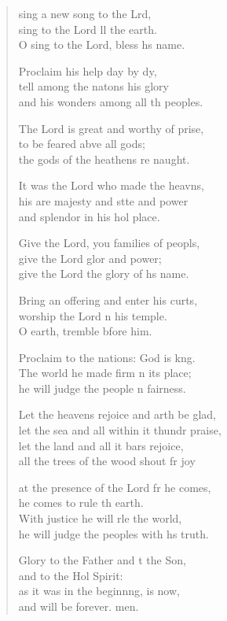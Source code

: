 \begin{verse}
  \begin{patverse}
 sing a new song to the Lrd,\Flex\\
sing to the Lord ll the earth.\Med\\
O sing to the Lord, bless h\pointup{\i}s name.

Proclaim his help day by dy,\Flex\\
tell among the nat\pointup{\i}ons his glory\Med\\
and his wonders among all th peoples.

The Lord is great and worthy of prise,\Flex\\
to be feared abve all gods;\Med\\
the gods of the heathens re naught.

It was the Lord who made the heavns,\Flex\\
his are majesty and stte and power\Med\\
and splendor in his hol place.

Give the Lord, you families of peopls,\Flex\\
give the Lord glor and power;\Med\\
give the Lord the glory of h\pointup{\i}s name.

Bring an offering and enter his curts,\Flex\\
worship the Lord \pointup{\i}n his temple.\Med\\
O earth, tremble bfore him.

Proclaim to the nations: God is k\pointup{\i}ng.\Flex\\
The world he made firm \pointup{\i}n its place;\Med\\
he will judge the people \pointup{\i}n fairness.

Let the heavens rejoice and arth be glad,\Med\\
let the sea and all within it thundr praise,\\
let the land and all it bars rejoice,\Med\\
all the trees of the wood shout fr joy

at the presence of the Lord fr he comes,\Med\\
he comes to rule th earth.\\
With justice he will rle the world,\Med\\
he will judge the peoples with h\pointup{\i}s truth.

Glory to the Father and t the Son,\Med\\
and to the Hol Spirit:\\
as it was in the beginn\pointup{\i}ng, is now,\Med\\
and will be forever. men. 
  \end{patverse}
\end{verse}
